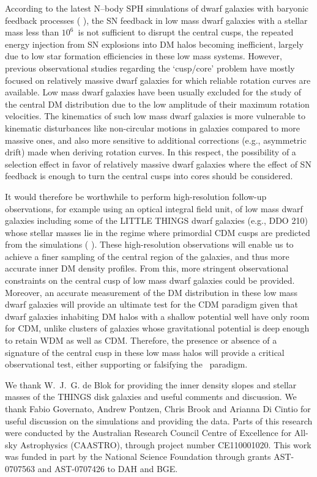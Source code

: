 \documentclass[natbib209]{emulateapj}
\begin{document}
According to the latest N--body SPH simulations of dwarf galaxies with baryonic
feedback processes (\citeauthor{Governato_2012} \citeyear{Governato_2012}), the
SN feedback in low mass dwarf galaxies with a stellar mass less than
$10^6$\Msun\ is not sufficient to disrupt the central cusps, the repeated energy injection 
from SN explosions into DM halos becoming inefficient,
largely due to low star formation efficiencies in these low mass systems. However, previous
observational studies regarding the `cusp/core' problem have mostly focused on
relatively massive dwarf galaxies for which reliable rotation curves are
available. Low mass dwarf galaxies have been usually excluded for the study of
the central DM distribution due to the low amplitude of their maximum
rotation velocities. The kinematics of such low mass dwarf galaxies is
more vulnerable to kinematic disturbances like non-circular motions in galaxies
compared to more massive ones, and also more sensitive to additional corrections
(e.g., asymmetric drift) made when deriving rotation curves. In this respect,
the possibility of a selection effect in favor of relatively massive dwarf
galaxies where the effect of SN feedback is enough to turn the central cusps
into cores should be considered.

It would therefore be worthwhile to perform high-resolution follow-up
observations, for example using an optical integral field unit,
of low mass dwarf galaxies including some of the LITTLE THINGS dwarf galaxies
(e.g., DDO 210) whose stellar masses lie in the regime where
primordial CDM cusps are predicted from the simulations
(\citeauthor{Governato_2012} \citeyear{Governato_2012}).
These high-resolution observations will enable us to
achieve a finer sampling of the central region of the galaxies, and thus more
accurate inner DM density profiles. From this, more stringent
observational constraints on the central cusp of low mass dwarf galaxies could
be provided. Moreover, an accurate measurement of the DM distribution in
these low mass dwarf galaxies will provide an ultimate test for the CDM paradigm
given that dwarf galaxies inhabiting DM halos with a shallow potential well have
only room for CDM, unlike clusters of galaxies whose gravitational potential is
deep enough to retain WDM as well as CDM. 
Therefore, the presence or absence of a signature of the
central cusp in these low mass halos will provide a critical observational
test, either supporting or falsifying the \LCDM\ paradigm.

\acknowledgements
We thank W.~J.~G. de Blok for providing the inner density slopes and stellar
masses of the THINGS disk galaxies and useful comments and discussion. We thank
Fabio Governato, Andrew Pontzen, Chris Brook and Arianna Di Cintio for useful
discussion on the simulations and providing the data. Parts of this research were
conducted by the Australian Research Council Centre of Excellence for All-sky Astrophysics (CAASTRO),
through project number CE110001020. This work was funded in
part by the National Science Foundation through grants AST-0707563 and
AST-0707426 to DAH and BGE.
\end{document}
